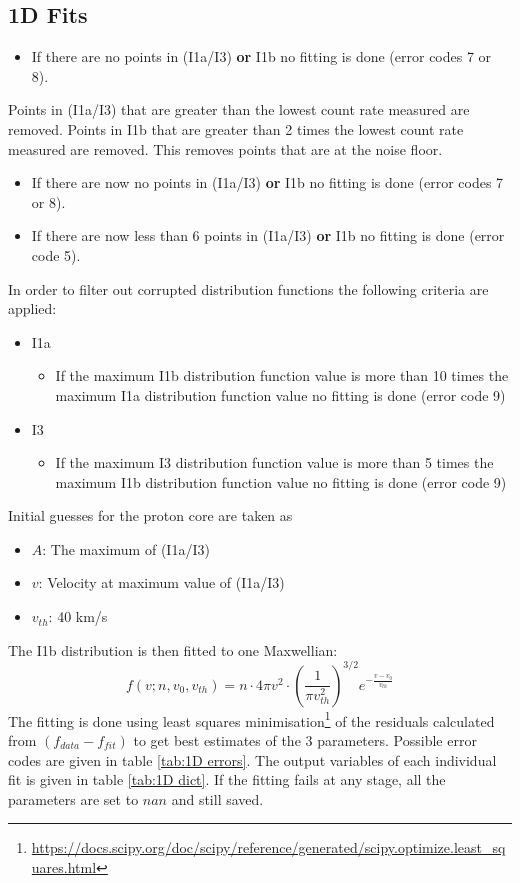 \documentclass[11pt,a4paper]{article}
\begin{document}
\subsection{1D Fits}
\begin{itemize}
	\item If there are no points in (I1a/I3) \textbf{or} I1b no fitting is done (error codes 7 or 8).
\end{itemize}
Points in (I1a/I3) that are greater than the lowest count rate measured are removed. Points in  I1b that are greater than 2 times the lowest count rate measured are removed. This removes points that are at the noise floor.
\begin{itemize}
	\item If there are now no points in (I1a/I3) \textbf{or} I1b no fitting is done (error codes 7 or 8).
	\item If there are now less than 6 points in (I1a/I3) \textbf{or} I1b no fitting is done (error code 5).
\end{itemize}
In order to filter out corrupted distribution functions the following criteria are applied:
\begin{itemize}
	\item I1a
	\begin{itemize}
		\item If the maximum I1b distribution function value is more than 10 times the maximum I1a distribution function value no fitting is done (error code 9)
	\end{itemize}
	\item I3
	\begin{itemize}
		\item If the maximum I3 distribution function value is more than 5 times the maximum I1b distribution function value no fitting is done (error code 9)
	\end{itemize}
\end{itemize}
Initial guesses for the proton core are taken as
\begin{itemize}
	\item $A$: The maximum of (I1a/I3)
	\item $v$: Velocity at maximum value of (I1a/I3)
	\item $v_{th}$: 40 km/s
\end{itemize}

The I1b distribution is then fitted to one Maxwellian:
\begin{equation}
	f \left ( v; n, v_{0}, v_{th} \right ) = n\cdot 4\pi v^{2} \cdot \left (\frac{1}{\pi v_{th}^{2}} \right )^{3/2} e^{-\frac{v - v_{0}}{v_{th}}}
\end{equation}
The fitting is done using least squares minimisation\footnote{\url{https://docs.scipy.org/doc/scipy/reference/generated/scipy.optimize.least_squares.html}} of the residuals calculated from $\left (f_{data} - f_{fit}\right )$ to get best estimates of the 3 parameters. Possible error codes are given in table \ref{tab:1D errors}. The output variables of each individual fit is given in table \ref{tab:1D dict}. If the fitting fails at any stage, all the parameters are set to $nan$ and still saved.
\end{document}
